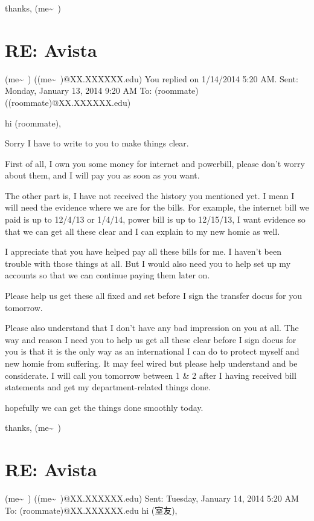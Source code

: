 \documentclass[12pt]{book}
\begin{document}
thanks,
(me\textasciitilde{}~)


\section{RE: Avista}
\label{sec-16-6}
(me\textasciitilde{}~) ((me\textasciitilde{}~)@XX.XXXXXX.edu)
You replied on 1/14/2014 5:20 AM.
Sent:        Monday, January 13, 2014 9:20 AM
To:        
(roommate) ((roommate)@XX.XXXXXX.edu)

hi (roommate), 

Sorry I have to write to you to make things clear. 

First of all, I own you some money for internet and powerbill, please don't worry about them, and I will pay you as soon as you want. 

The other part is, I have not received the history you mentioned yet. I mean I will need the evidence where we are for the bills. For example, the internet bill we paid is up to 12/4/13 or 1/4/14, power bill is up to 12/15/13, I want evidence so that we can get all these clear and I can explain to my new homie as well. 

I appreciate that you have helped pay all these bills for me. I haven't been trouble with those things at all. But I would also need you to help set up my accounts so that we can continue paying them later on. 

Please help us get these all fixed and set before I sign the transfer docus for you tomorrow. 

Please also understand that I don't have any bad impression on you at all. The way and reason I need you to help us get all these clear before I sign docus for you is that it is the only way as an international I can do to protect myself and new homie from suffering. It may feel wired but please help understand and be considerate. I will call you tomorrow between 1 \& 2 after I having received bill statements and get my department-related things done. 

hopefully we can get the things done smoothly today.

thanks,
(me\textasciitilde{}~)


\section{RE: Avista}
\label{sec-16-7}
(me\textasciitilde{}~) ((me\textasciitilde{}~)@XX.XXXXXX.edu)
Sent:        Tuesday, January 14, 2014 5:20 AM
To:        
(roommate)@XX.XXXXXX.edu
hi (室友), 
\end{document}
